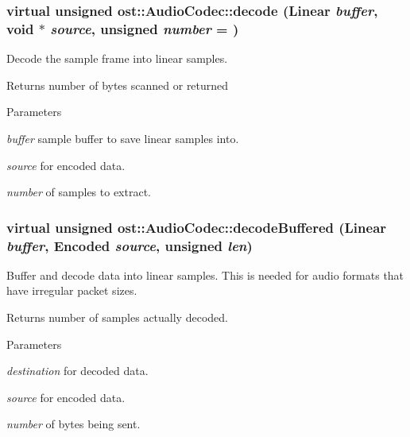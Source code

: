 \subsubsection[{decode}]{\setlength{\rightskip}{0pt plus 5cm}virtual unsigned ost::AudioCodec::decode ({\bf Linear} {\em buffer}, \/  void $\ast$ {\em source}, \/  unsigned {\em number} = {})\hspace{0.3cm}{\ttfamily  [pure virtual]}}\label{classost_1_1_audio_codec_a907e86027d1511babd9446eca3b19850}


Decode the sample frame into linear samples. \begin{DoxyReturn}{Returns}
number of bytes scanned or returned 
\end{DoxyReturn}

\begin{DoxyParams}{Parameters}
\item[{\em buffer}]sample buffer to save linear samples into. \item[{\em source}]for encoded data. \item[{\em number}]of samples to extract. \end{DoxyParams}
\subsubsection[{decodeBuffered}]{\setlength{\rightskip}{0pt plus 5cm}virtual unsigned ost::AudioCodec::decodeBuffered ({\bf Linear} {\em buffer}, \/  {\bf Encoded} {\em source}, \/  unsigned {\em len})\hspace{0.3cm}{\ttfamily  [virtual]}}\label{classost_1_1_audio_codec_aa7f2d6b1965cdb86839ef55d9970e98e}


Buffer and decode data into linear samples. This is needed for audio formats that have irregular packet sizes.

\begin{DoxyReturn}{Returns}
number of samples actually decoded. 
\end{DoxyReturn}

\begin{DoxyParams}{Parameters}
\item[{\em destination}]for decoded data. \item[{\em source}]for encoded data. \item[{\em number}]of bytes being sent. \end{DoxyParams}
